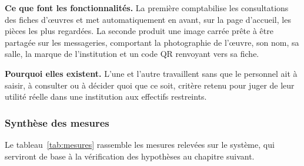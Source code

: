 \textbf{Ce que font les fonctionnalités.} La première comptabilise les
consultations des fiches d'œuvres et met automatiquement en avant, sur la page
d'accueil, les pièces les plus regardées. La seconde produit une image carrée
prête à être partagée sur les messageries, comportant la photographie de
l'œuvre, son nom, sa salle, la marque de l'institution et un code QR renvoyant
vers sa fiche.

\textbf{Pourquoi elles existent.} L'une et l'autre travaillent sans que le
personnel ait à saisir, à consulter ou à décider quoi que ce soit, critère
retenu pour juger de leur utilité réelle dans une institution aux effectifs
restreints.

\subsubsection{Synthèse des mesures}

Le tableau~\ref{tab:mesures} rassemble les mesures relevées sur le système, qui
serviront de base à la vérification des hypothèses au chapitre suivant.

